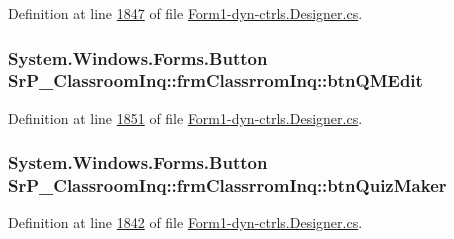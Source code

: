 \-Definition at line \hyperlink{_form1-dyn-ctrls_8_designer_8cs_source_l01847}{1847} of file \hyperlink{_form1-dyn-ctrls_8_designer_8cs_source}{\-Form1-\/dyn-\/ctrls.\-Designer.\-cs}.

\hypertarget{class_sr_p___classroom_inq_1_1frm_classrrom_inq_ab86f3e7a592038c27499e00ec0a7fb3b}{
\subsubsection[{btn\-Q\-M\-Edit}]{\setlength{\rightskip}{0pt plus 5cm}\-System.\-Windows.\-Forms.\-Button {\bf \-Sr\-P\-\_\-\-Classroom\-Inq\-::frm\-Classrrom\-Inq\-::btn\-Q\-M\-Edit}}}
\label{class_sr_p___classroom_inq_1_1frm_classrrom_inq_ab86f3e7a592038c27499e00ec0a7fb3b}


\-Definition at line \hyperlink{_form1-dyn-ctrls_8_designer_8cs_source_l01851}{1851} of file \hyperlink{_form1-dyn-ctrls_8_designer_8cs_source}{\-Form1-\/dyn-\/ctrls.\-Designer.\-cs}.

\hypertarget{class_sr_p___classroom_inq_1_1frm_classrrom_inq_a521d725b634462f428d792ca3db59e2e}{
\subsubsection[{btn\-Quiz\-Maker}]{\setlength{\rightskip}{0pt plus 5cm}\-System.\-Windows.\-Forms.\-Button {\bf \-Sr\-P\-\_\-\-Classroom\-Inq\-::frm\-Classrrom\-Inq\-::btn\-Quiz\-Maker}}}
\label{class_sr_p___classroom_inq_1_1frm_classrrom_inq_a521d725b634462f428d792ca3db59e2e}


\-Definition at line \hyperlink{_form1-dyn-ctrls_8_designer_8cs_source_l01842}{1842} of file \hyperlink{_form1-dyn-ctrls_8_designer_8cs_source}{\-Form1-\/dyn-\/ctrls.\-Designer.\-cs}.

